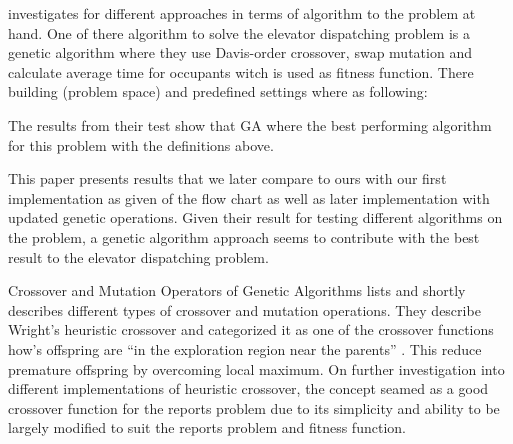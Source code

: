\cite{ahmed2022investigation} investigates for different approaches in terms of algorithm to the problem at hand.  One of there algorithm to solve the elevator dispatching problem is a genetic algorithm where they use Davis-order crossover, swap mutation and calculate average time for occupants  witch is used as fitness function. There building (problem space) and predefined settings where as following:

The results from their test show that GA where the best performing algorithm for this problem with the definitions above.

This paper presents results that we later compare to ours with our first implementation as given of the flow chart\cite{tartan2016genetic} as well as later implementation with updated genetic operations. Given their result for testing different algorithms on the problem, a genetic algorithm approach seems to contribute with the best result to the elevator dispatching problem.

Crossover and Mutation Operators of Genetic Algorithms \cite{lim2017crossover} lists and shortly describes different types of crossover and mutation operations. They describe Wright's heuristic crossover and categorized it as one of the crossover functions how’s offspring are “in the exploration region near the parents” \cite{lim2017crossover}. This reduce premature offspring by overcoming local maximum. On further investigation into different implementations of heuristic crossover, the concept seamed as a good crossover function for the reports problem due to its simplicity and ability to be largely modified to suit the reports problem and fitness function.


